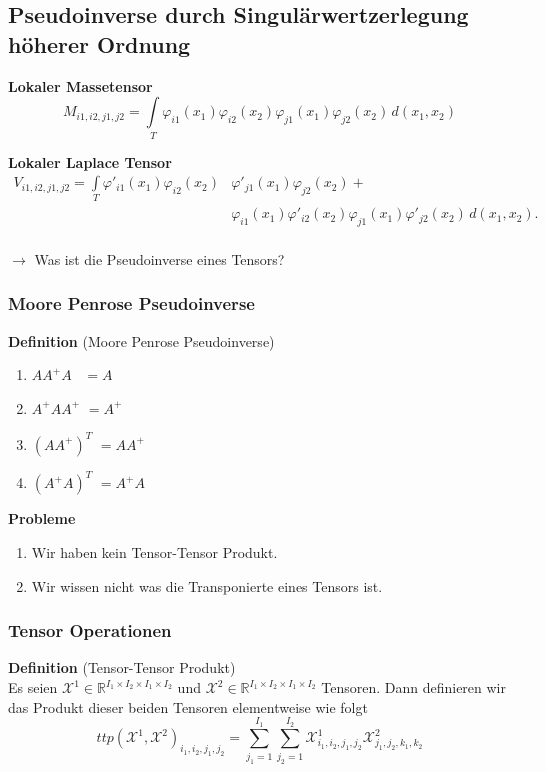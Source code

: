 \subsection{Pseudoinverse durch Singulärwertzerlegung höherer Ordnung}
\begin{frame}

\textbf{Lokaler Massetensor}
\begin{equation*} 
M_{i1,i2,j1,j2} = \int\limits_{T} \varphi_{i1} (x_1) \varphi_{i2}(x_2) \varphi_{j1} (x_1) \varphi_{j2} (x_2) \, d(x_1,x_2)
\end{equation*}

\textbf{Lokaler Laplace Tensor}
\begin{equation*} 
\begin{aligned}
V_{i1,i2,j1,j2} = \int\limits_{T} \varphi'_{i1} (x_1) \varphi_{i2}(x_2) &\varphi'_{j1} (x_1) \varphi_{j2} (x_2) + \\
&\varphi_{i1} (x_1) \varphi'_{i2}(x_2) \varphi_{j1} (x_1) \varphi'_{j2} (x_2) \, d(x_1,x_2).
\end{aligned}
\end{equation*} \\
$\rightarrow$ Was ist die Pseudoinverse eines Tensors?
\end{frame}

\begin{frame}
\frametitle{Moore Penrose Pseudoinverse}
\begin{framed}
\textbf{Definition} (Moore Penrose Pseudoinverse) 
\begin{enumerate}
\item $AA^{+}A \, \, \, \, \,  =A$
\item $A^{+}AA^{+} \, \, =A^{+}$ 
\item $(AA^{+})^{T} \, \,  =AA^{+}$
\item $(A^{+}A)^{T} \, \, =A^{+}A$ 
\end{enumerate}
\end{framed}
\textbf{Probleme}
\begin{enumerate}
\item Wir haben kein Tensor-Tensor Produkt.
\item Wir wissen nicht was die Transponierte eines Tensors ist.
\end{enumerate}
\end{frame}

\begin{frame}
\frametitle{Tensor Operationen}
\begin{framed} \textbf{Definition} (Tensor-Tensor Produkt) \\
Es seien $\pmb{\mathcal{X}}^1  \in \mathbb{R}^{I_1 \times I_2 \times I_1 \times I_2}$ und $\pmb{\mathcal{X}}^2 \in \mathbb{R}^{I_1 \times I_2 \times I_1 \times I_2}$ Tensoren.
Dann definieren wir das Produkt dieser beiden Tensoren elementweise wie folgt
\begin{equation}
ttp(\pmb{\mathcal{X}}^1,\pmb{\mathcal{X}}^2)_{i_1,i_2,j_1,j_2}= \sum_{j_1=1}^{I_1} \sum_{j_2=1}^{I_2} \pmb{\mathcal{X}}^1_{i_1,i_2,j_1,j_2} \pmb{\mathcal{X}}^2_{j_1,j_2,k_1,k_2} 
\end{equation}
\end{framed}
\end{frame}

